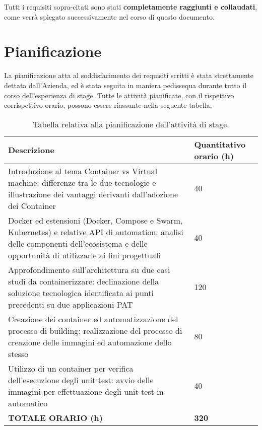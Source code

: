 Tutti i requisiti sopra-citati sono stati \textbf{completamente raggiunti e collaudati}, come verrà spiegato successivamente nel corso di questo documento.

\newpage
\section{Pianificazione}
La pianificazione atta al soddisfacimento dei requisiti scritti è stata strettamente dettata dall'Azienda, ed è stata seguita in maniera pedissequa durante tutto il corso dell'esperienza di stage.
Tutte le attività pianificate, con il rispettivo corrispettivo orario, possono essere riassunte nella seguente tabella:
\begin{table}[h!]
\centering
    \renewcommand{\arraystretch}{1.5}
    \begin{tabular}{|m{25em} | m{}|} 
    \hline
        \hfil \textbf{Descrizione} & \hfil \textbf{Quantitativo orario (h)} \\
    \hline\hline
        \hfil Introduzione al tema Container vs Virtual machine: differenze tra le due tecnologie e illustrazione dei vantaggi derivanti dall'adozione dei Container & 40 \\ 
    \hline
       \hfil Docker ed estensioni (Docker, Compose e Swarm, Kubernetes) e relative API di automation: analisi delle componenti dell'ecosistema e delle opportunità di utilizzarle ai fini progettuali & 40 \\
    \hline
        \hfil Approfondimento sull'architettura su due casi studi da containerizzare: declinazione della soluzione tecnologica identificata ai punti precedenti su due applicazioni PAT & 120 \\
    \hline
        \hfil Creazione dei container ed automatizzazione del processo di building: realizzazione del processo di creazione delle immagini ed automazione dello stesso & 80 \\
    \hline
        \hfil Utilizzo di un container per verifica dell'esecuzione degli unit test: avvio delle immagini per effettuazione degli unit test in automatico & 40 \\ [1ex] 
   \hline
    \textbf{TOTALE ORARIO (h)} & \textbf{320}\\
    \hline
    \end{tabular}
\medskip
\caption{Tabella relativa alla pianificazione dell'attività di stage.}
\label{table:tabella relativa alla pianificazione dello stage stabilita dall'Azienda}
\end{table}





